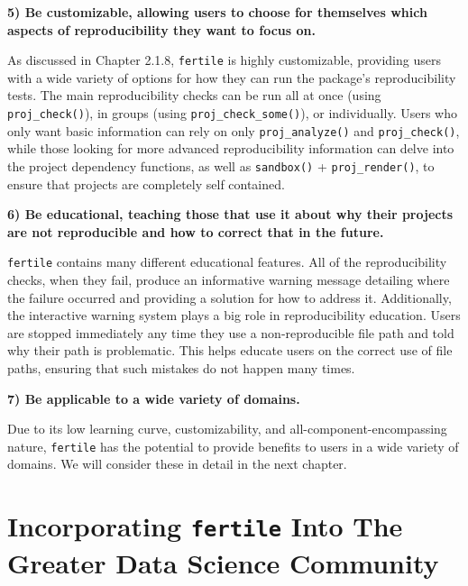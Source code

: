 \documentclass[12pt,twoside]{reedthesis}
\begin{document}
\textbf{5) Be customizable, allowing users to choose for themselves which aspects of reproducibility they want to focus on.}

As discussed in Chapter 2.1.8, \texttt{fertile} is highly customizable, providing users with a wide variety of options for how they can run the package's reproducibility tests. The main reproducibility checks can be run all at once (using \texttt{proj\_check()}), in groups (using \texttt{proj\_check\_some()}), or individually. Users who only want basic information can rely on only \texttt{proj\_analyze()} and \texttt{proj\_check()}, while those looking for more advanced reproducibility information can delve into the project dependency functions, as well as \texttt{sandbox()} + \texttt{proj\_render()}, to ensure that projects are completely self contained.

\textbf{6) Be educational, teaching those that use it about why their projects are not reproducible and how to correct that in the future.}

\texttt{fertile} contains many different educational features. All of the reproducibility checks, when they fail, produce an informative warning message detailing where the failure occurred and providing a solution for how to address it. Additionally, the interactive warning system plays a big role in reproducibility education. Users are stopped immediately any time they use a non-reproducible file path and told why their path is problematic. This helps educate users on the correct use of file paths, ensuring that such mistakes do not happen many times.

\textbf{7) Be applicable to a wide variety of domains.}

Due to its low learning curve, customizability, and all-component-encompassing nature, \texttt{fertile} has the potential to provide benefits to users in a wide variety of domains. We will consider these in detail in the next chapter.

\hypertarget{applications}{%
\chapter{\texorpdfstring{Incorporating \texttt{fertile} Into The Greater Data Science Community}{Incorporating fertile Into The Greater Data Science Community}}\label{applications}}
\end{document}
